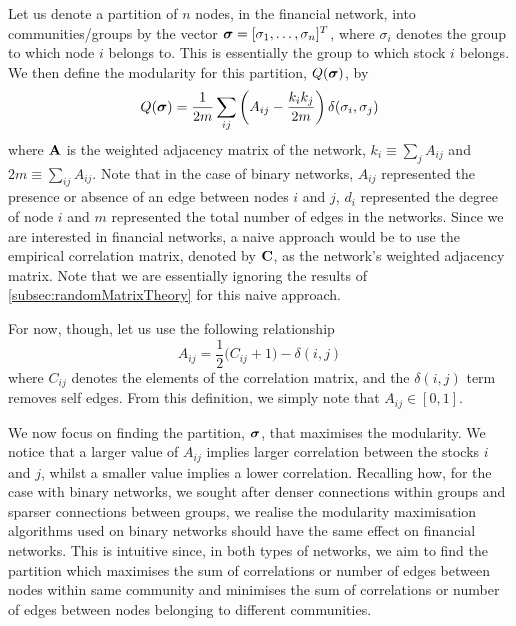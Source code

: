 Let us denote a partition of $n$ nodes, in the financial network, into communities/groups by the vector $\vecvar{\sigma} = \transpose{[\sigma_{1},\dots,\sigma_{n}]}$, where $\sigma_{i}$ denotes the group to which node $i$ belongs to.
This is essentially the group to which stock $i$ belongs.
We then define the modularity for this partition, $Q(\vecvar{\sigma})$, by
\begin{equation}
\label{eq:modularityFinancialNetworks}
	Q(\vecvar{\sigma}) = \frac{1}{2m} \sum_{ij} \left(A_{ij} - \frac{k_{i}k_{j}}{2m} \right) \delta(\sigma_{i},\sigma_{j})
\end{equation}
where $\mathbf A$ is the weighted adjacency matrix of the network, $k_{i} \equiv \sum_{j} A_{ij}$ and $2m \equiv \sum_{ij} A_{ij}$.
Note that in the case of binary networks, $A_{ij}$ represented the presence or absence of an edge between nodes $i$ and $j$, $d_{i}$ represented the degree of node $i$ and $m$ represented the total number of edges in the networks.
Since we are interested in financial networks, a naive approach would be to use the empirical correlation matrix, denoted by $\mathbf C$, as the network's weighted adjacency matrix.
Note that we are essentially ignoring the results of \cref{subsec:randomMatrixTheory} for this naive approach.

For now, though, let us use the following relationship
\begin{equation}
\label{eq:weightedAdjacencyMatrixFinancialNetworks}
	A_{ij} = \frac{1}{2} \big( C_{ij}+1 \big) - \delta(i,j)
\end{equation}
where $C_{ij}$ denotes the elements of the correlation matrix, and the $\delta(i,j)$ term removes self edges.
From this definition, we simply note that $A_{ij} \in [0,1]$.

We now focus on finding the partition, $\vecvar{\sigma}$, that maximises the modularity.
We notice that a larger value of $A_{ij}$ implies larger correlation between the stocks $i$ and $j$, whilst a smaller value implies a lower correlation.
Recalling how, for the case with binary networks, we sought after denser connections within groups and sparser connections between groups, we realise the modularity maximisation algorithms used on binary networks should have the same effect on financial networks.
This is intuitive since, in both types of networks, we aim to find the partition which maximises the sum of correlations or number of edges between nodes within same community and minimises the sum of correlations or number of edges between nodes belonging to different communities.

